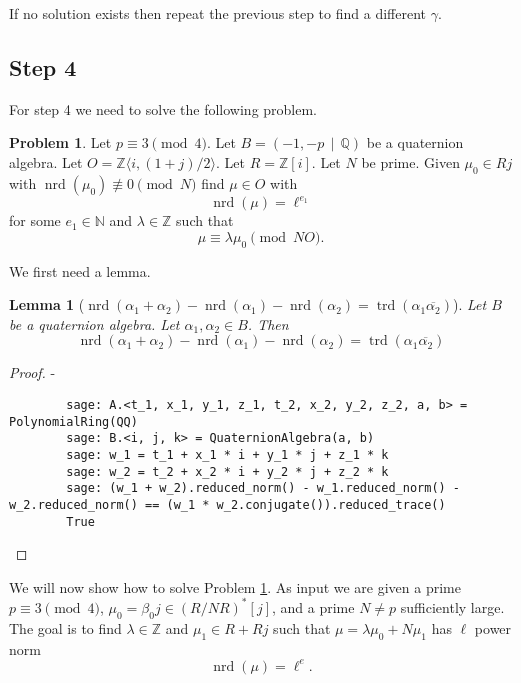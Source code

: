 \documentclass[10pt]{article}
\theoremstyle{plain}
\newtheorem{lemma}[theorem]{Lemma}
\theoremstyle{definition}
\newtheorem{prob}[theorem]{Problem}
\newcommand{\op}{\operatorname}
\newcommand{\N}{\mathbb{N}}
\newcommand{\Z}{\mathbb{Z}}
\newcommand{\Q}{\mathbb{Q}}
\newcommand{\nrd}{\op{nrd}}
\newcommand{\trd}{\op{trd}}
\begin{document}
If no solution exists then repeat the previous step to find a different \( \gamma \).

\subsection{Step 4}
For step 4 we need to solve the following problem.

\begin{prob} \label{prob: mu = lambda * mu_0}
    Let \( p \equiv 3 \pmod{4} \).
    Let \( B =  (-1, -p \, \mid \, \Q) \) be a quaternion algebra.
    Let \( O = \Z \langle i, (1+j) / 2 \rangle \).
    Let \( R = \Z[i] \).
    Let \( N \) be prime.
    Given \( \mu_0 \in Rj \) with \( \nrd(\mu_0) \not\equiv 0 \pmod{N} \) find \( \mu \in O \) with
    \[
        \nrd(\mu) = \ell^{e_1}
    \]
    for some \( e_1 \in \N \) and \(\lambda \in \Z \) such that
    \[
        \mu \equiv \lambda \mu_0 \pmod{NO}.
    \]
\end{prob}

We first need a lemma.
\begin{lemma}[\( \nrd(\alpha_1 + \alpha_2) - \nrd(\alpha_1) - \nrd(\alpha_2) = \trd(\alpha_1 \overline{\alpha_2}) \)]
    Let \( B \) be a quaternion algebra.
    Let \( \alpha_1, \alpha_2 \in B \).
    Then
    \[
        \nrd(\alpha_1 + \alpha_2) - \nrd(\alpha_1) - \nrd(\alpha_2)
        = \trd(\alpha_1 \overline{\alpha_2})
    \]
\end{lemma}
\begin{proof}
    -
    \begin{lstlisting}
        sage: A.<t_1, x_1, y_1, z_1, t_2, x_2, y_2, z_2, a, b> = PolynomialRing(QQ)
        sage: B.<i, j, k> = QuaternionAlgebra(a, b)
        sage: w_1 = t_1 + x_1 * i + y_1 * j + z_1 * k
        sage: w_2 = t_2 + x_2 * i + y_2 * j + z_2 * k
        sage: (w_1 + w_2).reduced_norm() - w_1.reduced_norm() - w_2.reduced_norm() == (w_1 * w_2.conjugate()).reduced_trace()
        True
    \end{lstlisting}
\end{proof}


We will now show how to solve Problem \ref{prob: mu = lambda * mu_0}.
As input we are given a prime \( p \equiv 3 \pmod{4} \), \( \mu_0 = \beta_0j \in (R / NR)^*[j] \), and a prime \( N \neq p \) sufficiently large.
The goal is to find \( \lambda \in \Z \) and \( \mu_1 \in  R + Rj \) such that \( \mu = \lambda \mu_0 + N \mu_1 \) has \( \ell \) power norm
\[
    \nrd(\mu) = \ell^e.
\]
\end{document}
